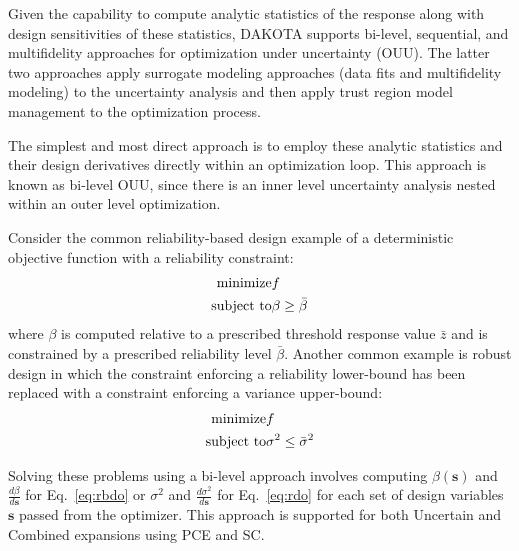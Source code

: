 Given the capability to compute analytic statistics of the response
along with design sensitivities of these statistics, DAKOTA supports
bi-level, sequential, and multifidelity approaches for optimization
under uncertainty (OUU). %
The latter two approaches apply surrogate modeling approaches (data 
fits and multifidelity modeling) to the uncertainty analysis and then 
apply trust region model management to the optimization process.

The simplest and most direct approach is to employ these analytic
statistics and their design derivatives directly within an
optimization loop.  This approach is known as bi-level OUU, since
there is an inner level uncertainty analysis nested within an outer
level optimization.

Consider the common reliability-based design example of a deterministic 
objective function with a reliability constraint:
\begin{eqnarray}
  {\rm minimize }     & f \nonumber \\
  {\rm subject \ to } & \beta \ge \bar{\beta} \label{eq:rbdo}
\end{eqnarray}
where $\beta$ is computed relative to a prescribed threshold response
value $\bar{z}$ and is constrained by a prescribed reliability level
$\bar{\beta}$.  Another common example is robust design in which the
constraint enforcing a reliability lower-bound has been replaced with
a constraint enforcing a variance upper-bound:
\begin{eqnarray}
  {\rm minimize }     & f \nonumber \\
  {\rm subject \ to } & \sigma^2 \le \bar{\sigma}^2 \label{eq:rdo}
\end{eqnarray}

Solving these problems using a bi-level approach involves computing
$\beta(\boldsymbol{s})$ and $\frac{d\beta}{d\boldsymbol{s}}$ for
Eq.~\ref{eq:rbdo} or $\sigma^2$ and $\frac{d\sigma^2}{d\boldsymbol{s}}$
for Eq.~\ref{eq:rdo} for each set of design variables $\boldsymbol{s}$
passed from the optimizer.  This approach is supported for both 
Uncertain and Combined expansions using PCE and SC.

